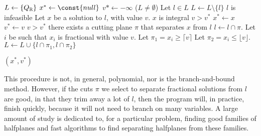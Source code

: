 \begin{codebox}
\li $L \gets \{Q_{\mathbb{R}}\}$
\li $x^* \gets \const{null}$
\li $v* \gets -\infty$
\li \While ($L \ne \emptyset$)
 \Do
\li    Let $l \in L$
\li    $L \gets L \setminus \{l\}$
\li    \If $l$ is infeasible
    \Do
\li      {}
    \End
\li    Let $x$ be a solution to $l$, with value $v$.
\li    \If $x$ is integral
    \Do
\li      \If $v > v^*$
         \Do
\li        $x^* \gets x$
\li        $v^* \gets v$
         \End
\li      {}
    \End
\li    \If $v > v^*$
    \Do
\li    \If there exists a cutting plane $\pi$ that separates $x$ from $l$
    \Do
\li      $l \gets l \cap \pi$.
\li      {}
    \End
\li    Let $i$ be such that $x_i$ is fractional with value $v$.
\li    Let $\pi_1 = x_i \ge \lceil v \rceil$
\li    Let $\pi_2 = x_i \le \lfloor v \rfloor$.
\li    $L \gets L \cup \{l \cap \pi_1, l \cap \pi_2\}$
    \End
  \End

\li \Return $(x^*, v^*)$
\end{codebox}

This procedure is not, in general, polynomial, nor is the branch-and-bound method. However, if the cuts $\pi$ we select to separate fractional solutions from $l$ are good, in that they trim away a lot of $l$, then the program will, in practice, finish quickly, because it will not need to branch on many variables. A large amount of study is dedicated to, for a particular problem, finding good families of halfplanes and fast algorithms to find separating halfplanes from these families.
